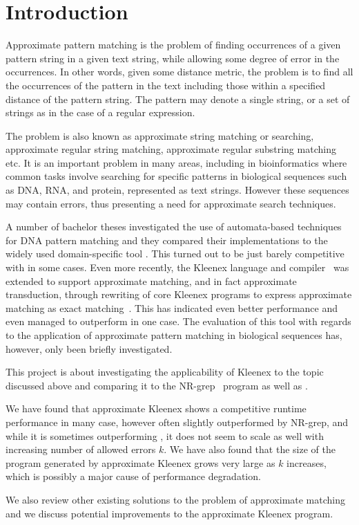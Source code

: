 \section{Introduction}

Approximate pattern matching is the problem of finding occurrences of a given
pattern string in a given text string, while allowing some degree of error in
the occurrences. In other words, given some distance metric, the problem is to
find all the occurrences of the pattern in the text including those within a
specified distance of the pattern string. The pattern may denote a single
string, or a set of strings as in the case of a regular expression.

The problem is also known as approximate string matching or searching,
approximate regular string matching, approximate regular substring matching
etc. It is an important problem in many areas, including in bioinformatics
where common tasks involve searching for specific patterns in biological
sequences such as DNA, RNA, and protein, represented as text strings. However
these sequences may contain errors, thus presenting a need for approximate
search techniques.

A number of bachelor theses investigated the use of automata-based techniques
for DNA pattern matching and they compared their implementations to the widely
used domain-specific tool \sfm{}.  This turned out to be just barely
competitive with \sfm{} in some cases. Even more recently, the Kleenex language
and compiler~\cite{grathwohl2016kleenex,soholm2015ordered} was extended to
support approximate matching, and in fact approximate transduction, through
rewriting of core Kleenex programs to express approximate matching as exact
matching~\cite{troelsen2016approximate}. This has indicated even better
performance and even managed to outperform \sfm{} in one case. The evaluation
of this tool with regards to the application of approximate pattern matching in
biological sequences has, however, only been briefly investigated.

This project is about investigating the applicability of Kleenex to the topic
discussed above and comparing it to the NR-grep~\cite{navarro2001nr} program as
well as \sfm{}.

We have found that approximate Kleenex shows a competitive runtime performance
in many case, however often slightly outperformed by NR-grep, and while it is
sometimes outperforming \sfm{}, it does not seem to scale as well with increasing
number of allowed errors $k$. We have also found that the size of the program
generated by approximate Kleenex grows very large as $k$ increases, which is
possibly a major cause of performance degradation.

We also review other existing solutions to the problem of approximate matching
and we discuss potential improvements to the approximate Kleenex program.

